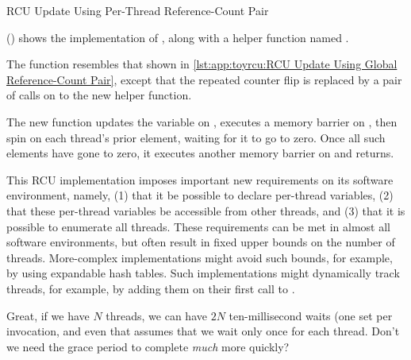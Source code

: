 \begin{listing}[tbp]

\caption{RCU Update Using Per-Thread Reference-Count Pair}
\label{lst:app:toyrcu:RCU Update Using Per-Thread Reference-Count Pair}
\end{listing}

()
shows the implementation of , along with a helper
function named .
\begin{lineref}
The  function resembles that shown in
\cref{lst:app:toyrcu:RCU Update Using Global Reference-Count Pair},
except that the repeated counter flip is replaced by a pair of calls
on  to the new helper function.
\end{lineref}

\begin{lineref}
The new  function updates the
 variable on ,
executes a memory barrier on ,
then 
spin on each thread's prior  element,
waiting for it to go to zero.
Once all such elements have gone to zero,
it executes another memory barrier on  and returns.
\end{lineref}

This RCU implementation imposes important new requirements on its
software environment, namely, (1) that it be possible to declare
per-thread variables, (2) that these per-thread variables be accessible
from other threads, and (3) that it is possible to enumerate all threads.
These requirements can be met in almost all software environments,
but often result in fixed upper bounds on the number of threads.
More-complex implementations might avoid such bounds, for example, by using
expandable hash tables.
Such implementations might dynamically track threads, for example, by
adding them on their first call to .

\QuickQuiz{}
	Great, if we have $N$ threads, we can have $2N$ ten-millisecond
	waits (one set per  invocation,
	and even that assumes that we wait only once for each thread.
	Don't we need the grace period to complete \emph{much} more quickly?
 \QuickQuizEnd

